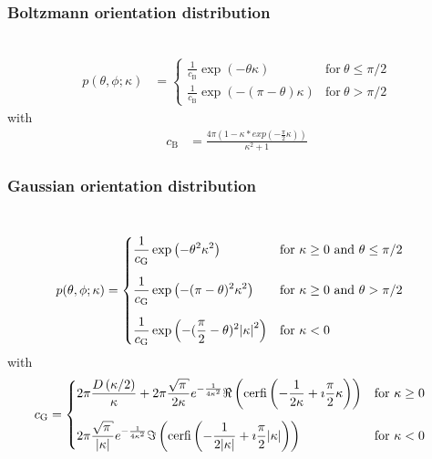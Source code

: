 
\newpage
\subsubsection{Boltzmann orientation distribution} ~\\

\begin{align}
p(\theta,\phi;\kappa) & = 
\begin{cases}
\displaystyle
\frac{1}{c_\mathrm{B}}\exp\left(-\theta\kappa\right) & \mathrm{for~}  \theta \leq \pi/2\\[5mm]
\displaystyle
\frac{1}{c_\mathrm{B}}\exp\left(-(\pi-\theta)\kappa\right) & \mathrm{for~}  \theta > \pi/2
\end{cases}
\end{align}
with
\begin{align}
c_\mathrm{B} &= \frac{4\pi\left(1-\kappa*exp\left(-\frac{\pi}{2}\kappa\right)\right)}{\kappa^2+1}
\end{align}

\newpage
\subsubsection{Gaussian orientation distribution}
\label{sect:ShearedCylinderGaussian}
~\\
\begin{align}
p(\theta,\phi;\kappa) & = 
\begin{cases}
\displaystyle
\frac{1}{c_\mathrm{G}}\exp\left(-\theta^2\kappa^2\right) & \mathrm{for~} \kappa \geq 0 \mathrm{~and~} \theta \leq \pi/2\\[5mm]
\displaystyle
\frac{1}{c_\mathrm{G}}\exp\left(-(\pi-\theta)^2\kappa^2\right) & \mathrm{for~} \kappa \geq 0 \mathrm{~and~} \theta > \pi/2\\[5mm]
\displaystyle
\frac{1}{c_\mathrm{G}}\exp\left(-(\frac{\pi}{2}-\theta)^2\abs{\kappa}^2\right) & \mathrm{for~} \kappa < 0 
\end{cases}
\end{align}
with
\begin{align}
c_\mathrm{G} & =
\begin{cases}\displaystyle
2\pi\frac{D\left(\kappa/2\right)}{\kappa}
           +2\pi\frac{\sqrt{\pi}}{2\kappa} e^{-\frac{1}{4\kappa^2}} \Re\left(\mathrm{cerfi}\left(-\frac{1}{2\kappa}+\imath\frac{\pi}{2}\kappa\right) \right)& \mathrm{for~} \kappa \geq 0 \\[5mm]
\displaystyle
2\pi\frac{\sqrt{\pi}}{\abs{\kappa}} e^{-\frac{1}{4\kappa^2}} \Im\left(\mathrm{cerfi}\left(-\frac{1}{2\abs{\kappa}}+\imath\frac{\pi}{2}\abs{\kappa}\right) \right) & \mathrm{for~} \kappa < 0
\end{cases}
\end{align}

